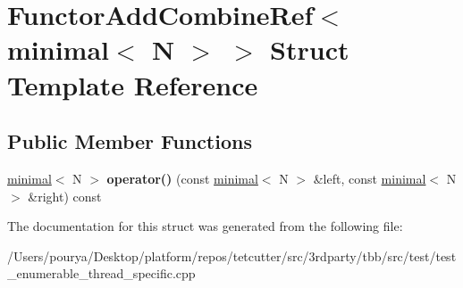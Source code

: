 \hypertarget{structFunctorAddCombineRef_3_01minimal_3_01N_01_4_01_4}{}\section{Functor\+Add\+Combine\+Ref$<$ minimal$<$ N $>$ $>$ Struct Template Reference}
\label{structFunctorAddCombineRef_3_01minimal_3_01N_01_4_01_4}
\subsection*{Public Member Functions}
\begin{DoxyCompactItemize}
\item 
\hypertarget{structFunctorAddCombineRef_3_01minimal_3_01N_01_4_01_4_aaed80b17afb369f61df50c572ee61394}{}\hyperlink{classminimal}{minimal}$<$ N $>$ {\bfseries operator()} (const \hyperlink{classminimal}{minimal}$<$ N $>$ \&left, const \hyperlink{classminimal}{minimal}$<$ N $>$ \&right) const \label{structFunctorAddCombineRef_3_01minimal_3_01N_01_4_01_4_aaed80b17afb369f61df50c572ee61394}

\end{DoxyCompactItemize}


The documentation for this struct was generated from the following file\+:\begin{DoxyCompactItemize}
\item 
/\+Users/pourya/\+Desktop/platform/repos/tetcutter/src/3rdparty/tbb/src/test/test\+\_\+enumerable\+\_\+thread\+\_\+specific.\+cpp\end{DoxyCompactItemize}
